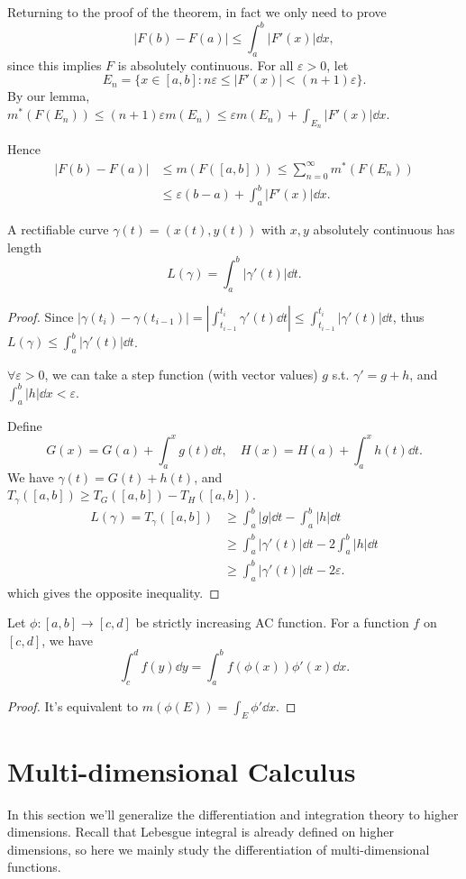 Returning to the proof of the theorem,
in fact we only need to prove
\[
|F(b) - F(a)|\le \int_{a}^{b} |F'(x)|\dd x,
\]
since this implies $F$ is absolutely continuous.
For all $\varepsilon > 0$, let
\[
	E_n = \{x\in [a,b]: n\varepsilon \le |F'(x)| < (n+1)\varepsilon\}.
\]
By our lemma, $m^*(F(E_n))\le (n+1)\varepsilon m(E_n)\le \varepsilon m(E_n)
+ \int_{E_n} |F'(x)|\dd x$.

Hence
\begin{align*}
	|F(b) - F(a)| &\le m(F([a,b]))
	\le \sum_{n=0}^{\infty} m^*(F(E_n))\\
	&\le \varepsilon(b-a) + \int_{a}^{b} |F'(x)|\dd x.
\end{align*}

\begin{theorem}
    A rectifiable curve $\gamma(t) = (x(t), y(t))$ with $x,y$ absolutely
	continuous has length
	\[
	L(\gamma) = \int_{a}^{b} |\gamma'(t)|\dd t.
	\]
\end{theorem}
\begin{proof}[Proof]
    Since $|\gamma(t_i) - \gamma(t_{i-1})| = |\int_{t_{i-1}}^{t_i} \gamma'(t)\dd t|
	\le \int_{t_{i-1}}^{t_i} |\gamma'(t)|\dd t$,
	thus $L(\gamma)\le \int_{a}^{b} |\gamma'(t)|\dd t$.

	$\forall \varepsilon>0$, we can take a step function (with vector values)
	$g$ s.t. $\gamma' = g + h$, and $\int_{a}^{b} |h|\dd x < \varepsilon$.

	Define
	\[
	G(x) = G(a) + \int_{a}^{x} g(t)\dd t,\quad
	H(x) = H(a) + \int_{a}^{x} h(t)\dd t.
	\]
	We have $\gamma(t) = G(t) + h(t)$,
	and $T_\gamma([a,b])\ge T_G([a,b])-T_H([a,b])$.
	\begin{align*}
		L(\gamma) =
		T_\gamma([a,b]) &\ge \int_{a}^{b} |g|\dd t - \int_{a}^{b} |h|\dd t\\
		&\ge \int_{a}^{b} |\gamma'(t)|\dd t - 2\int_{a}^{b} |h|\dd t\\
		&\ge \int_{a}^{b} |\gamma'(t)|\dd t - 2 \varepsilon.
	\end{align*}
	which gives the opposite inequality.
\end{proof}

\begin{proposition}
	Let $\phi:[a,b]\to [c,d]$ be strictly increasing AC function.
	For a function $f$ on $[c,d]$, we have
	\[
	\int_{c}^{d} f(y)\dd y = \int_{a}^{b} f(\phi(x))\phi'(x) \dd x.
	\]
\end{proposition}
\begin{proof}[Proof]
    It's equivalent to $m(\phi(E)) = \int_E \phi' \dd x$.
\end{proof}

\section{Multi-dimensional Calculus}
\label{sec:Multi-dimensional Calculus}

In this section we'll generalize the differentiation and integration theory
to higher dimensions. Recall that Lebesgue integral is already
defined on higher dimensions, so here we mainly study the differentiation
of multi-dimensional functions.

